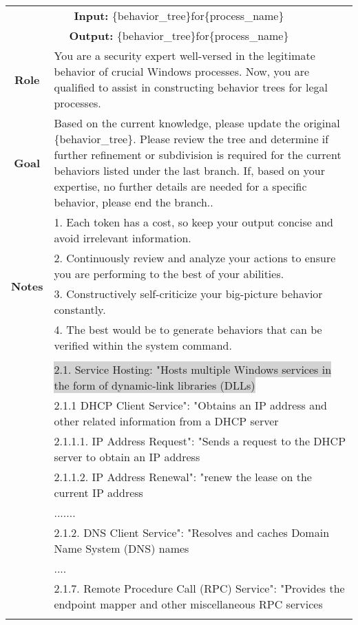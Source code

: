 \begin{tabularx}{\textwidth}{|c|X|}
\hline
\multicolumn{2}{|c|}{\textbf{Input:} \colorbox{SoftRed}{\{behavior\_tree\}}for\colorbox{codegreen}{\{process\_name\}}} \\
\multicolumn{2}{|c|}{\textbf{Output:} \colorbox{SoftRed}{\{behavior\_tree\}}for\colorbox{codegreen}{\{process\_name\}}} \\
\hline
\textbf{Role} & You are a security expert well-versed in the legitimate behavior of crucial Windows processes. Now, you are qualified to assist in constructing behavior trees for legal processes. \\
\hline
\textbf{Goal} & 
Based on the current knowledge, please update the original \colorbox{SoftRed}{\{behavior\_tree\}}.
Please review the tree and determine if further refinement or subdivision is required for the current behaviors listed under the last branch. If, based on your expertise, no further details are needed for a specific behavior, please end the branch..
\\ 
\hline

\multirow{5}{*}{\textbf{Notes}} 
& 1. Each token has a cost, so keep your output concise and avoid irrelevant information. \\
& 2. Continuously review and analyze your actions to ensure you are performing to the best of your abilities. \\
& 3. Constructively self-criticize your big-picture behavior constantly. \\
& 4. The best would be to generate behaviors that can be verified within the system command. \\
\hline

\textbf{\colorbox{codeorange}{LLM Response}} \\
& \colorbox{lightgray} {2.1. Service Hosting: "Hosts multiple Windows services in the form of dynamic-link libraries (DLLs)} \\
& 2.1.1 DHCP Client Service": "Obtains an IP address and other related information from a DHCP server \\
& 2.1.1.1. IP Address Request": "Sends a request to the DHCP server to obtain an IP address \\
& 2.1.1.2. IP Address Renewal": "renew the lease on the current IP address \\
& .......\\
& 2.1.2. DNS Client Service": "Resolves and caches Domain Name System (DNS) names \\
& .... \\
& 2.1.7. Remote Procedure Call (RPC) Service": "Provides the endpoint mapper and other miscellaneous RPC services\\
\\
\hline
\end{tabularx}

